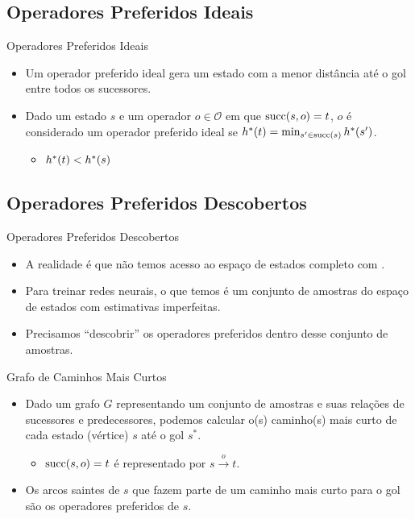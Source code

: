 \documentclass{beamer}
\begin{document}
\subsection{Operadores Preferidos Ideais}
\begin{frame}{Operadores Preferidos Ideais}
\begin{itemize}
  \item Um operador preferido ideal gera um estado com a \alert{menor distância até o gol} entre todos os sucessores.
  \pause
  \item Dado um estado $s$ e um operador $o \in \mathcal{O}$ em que $\operatorname{succ}(s,o) = t$, $o$ é considerado um operador preferido ideal se $h^*({t}) = \min_{s' \in \operatorname{succ}(s)} h^*({s'})$.
  \begin{itemize}
    \item $h^*({t}) < h^*({s})$
  \end{itemize}
\end{itemize}
\end{frame}

\subsection{Operadores Preferidos Descobertos}
\begin{frame}{Operadores Preferidos Descobertos}
\begin{itemize}
  \item A realidade é que \alert{não temos acesso ao espaço de estados completo} com \hstar.
  \pause
  \item Para treinar redes neurais, o que temos é um \alert{conjunto de amostras} do espaço de estados com \alert{estimativas imperfeitas}.
  \pause
  \item Precisamos ``descobrir'' os operadores preferidos dentro desse conjunto de amostras.
\end{itemize}
\end{frame}

\begin{frame}{Grafo de Caminhos Mais Curtos}
\begin{itemize}
  \item Dado um grafo $G$ representando um \alert{conjunto de amostras} e suas relações de sucessores e predecessores, podemos calcular o(s) \alert{caminho(s) mais curto de cada estado} (vértice) $s$ até o gol $s^{*}$.
  \begin{itemize}
    \item $\operatorname{succ}(s, o) = t$ é representado por $s \xrightarrow{o} t$.
  \end{itemize}
  \pause
  \item Os \alert{arcos saintes} de $s$ que \alert{fazem parte de um caminho mais curto} para o gol são os \alert{operadores preferidos} de $s$.
\end{itemize}
\end{frame}
\end{document}
